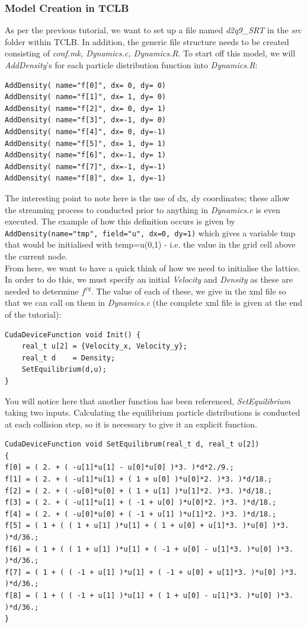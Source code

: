 \documentclass[12pt,a4paper]{report}
\begin{document}
\subsubsection{Model Creation in TCLB}
As per the previous tutorial, we want to set up a file named \textit{d2q9\_SRT} in the \textit{src} folder within TCLB. In addition, the generic file structure needs to be created consisting of \textit{conf.mk, Dynamics.c, Dynamics.R}. To start off this model, we will \textit{AddDensity}'s for each particle distribution function into \textit{Dynamics.R}:
\begin{lstlisting}
AddDensity( name="f[0]", dx= 0, dy= 0)
AddDensity( name="f[1]", dx= 1, dy= 0)
AddDensity( name="f[2]", dx= 0, dy= 1)
AddDensity( name="f[3]", dx=-1, dy= 0)
AddDensity( name="f[4]", dx= 0, dy=-1)
AddDensity( name="f[5]", dx= 1, dy= 1)
AddDensity( name="f[6]", dx=-1, dy= 1)
AddDensity( name="f[7]", dx=-1, dy=-1)
AddDensity( name="f[8]", dx= 1, dy=-1)
\end{lstlisting} 

The interesting point to note here is the use of dx, dy coordinates; these allow the streaming process to conducted prior to anything in \textit{Dynamics.c} is even executed. The example of how this definition occurs is given by \lstinline$AddDensity(name="tmp", field="u", dx=0, dy=1)$ which gives a variable tmp that would be initialised with temp=u(0,1) - i.e. the value in the grid cell above the current node.\\

From here, we want to have a quick think of how we need to initialise the lattice. In order to do this, we must specify an initial \textit{Velocity} and \textit{Density} as these are needed to determine $f^{eq}$. The value of each of these, we give in the xml file so that we can call on them in \textit{Dynamics.c} (the complete xml file is given at the end of the tutorial):
\begin{lstlisting}
CudaDeviceFunction void Init() {
	real_t u[2] = {Velocity_x, Velocity_y};
	real_t d    = Density;
	SetEquilibrium(d,u);
}
\end{lstlisting} 

You will notice here that another function has been referenced, \textit{SetEquilibrium} taking two inputs. Calculating the equilibrium particle distributions is conducted at each collision step, so it is necessary to give it an explicit function.
\begin{lstlisting}
CudaDeviceFunction void SetEquilibrum(real_t d, real_t u[2])
{
f[0] = ( 2. + ( -u[1]*u[1] - u[0]*u[0] )*3. )*d*2./9.;
f[1] = ( 2. + ( -u[1]*u[1] + ( 1 + u[0] )*u[0]*2. )*3. )*d/18.;
f[2] = ( 2. + ( -u[0]*u[0] + ( 1 + u[1] )*u[1]*2. )*3. )*d/18.;
f[3] = ( 2. + ( -u[1]*u[1] + ( -1 + u[0] )*u[0]*2. )*3. )*d/18.;
f[4] = ( 2. + ( -u[0]*u[0] + ( -1 + u[1] )*u[1]*2. )*3. )*d/18.;
f[5] = ( 1 + ( ( 1 + u[1] )*u[1] + ( 1 + u[0] + u[1]*3. )*u[0] )*3. )*d/36.;
f[6] = ( 1 + ( ( 1 + u[1] )*u[1] + ( -1 + u[0] - u[1]*3. )*u[0] )*3. )*d/36.;
f[7] = ( 1 + ( ( -1 + u[1] )*u[1] + ( -1 + u[0] + u[1]*3. )*u[0] )*3. )*d/36.;
f[8] = ( 1 + ( ( -1 + u[1] )*u[1] + ( 1 + u[0] - u[1]*3. )*u[0] )*3. )*d/36.;
}
\end{lstlisting} 
\end{document}
